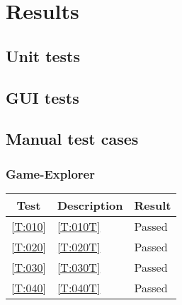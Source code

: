 \section{Results}
\subsection{Unit tests}


\subsection{GUI tests}


\subsection{Manual test cases}

\subsubsection{Game-Explorer}

\begin{tabular}{cll}
	\hline
	\textbf{Test} & \textbf{Description} & \textbf{Result} \\
	\hline
	\ref{T:010} & \ref{T:010T} & Passed \\
	\ref{T:020} & \ref{T:020T} & Passed \\
	\ref{T:030} & \ref{T:030T} & Passed \\
	\ref{T:040} & \ref{T:040T} & Passed \\
	\hline
\end{tabular}

